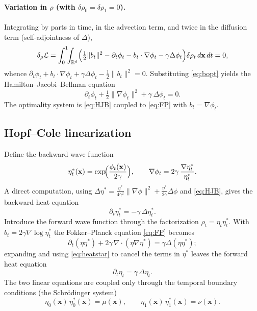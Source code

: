 \documentclass[11pt]{article}
\theoremstyle{remark}
\newcommand{\xv}{\mathbf{x}}
\newcommand{\grad}{\nabla}
\newcommand{\dive}{\grad\!\cdot\!}
\newcommand{\Rd}{\mathbb{R}^d}
\begin{document}
\paragraph{Variation in $\rho$ (with $\delta\rho_0=\delta\rho_1=0$).}
Integrating by parts in time, in the advection term, and twice in the diffusion term (self-adjointness of $\Delta$),
\begin{equation}
\delta_\rho\mathcal{L}=\int_0^1\!\!\int_{\Rd}\Bigl(\tfrac12\|b_t\|^2-\partial_t\phi_t-b_t\cdot\grad\phi_t-\gamma\Delta\phi_t\Bigr)\delta\rho_t\,d\xv\,dt=0,
\end{equation}
whence $\partial_t\phi_t+b_t\cdot\grad\phi_t+\gamma\Delta\phi_t-\tfrac12\|b_t\|^2=0$. Substituting \eqref{eq:bopt} yields the Hamilton--Jacobi--Bellman equation
\begin{equation}
\label{eq:HJB}
\partial_t\phi_t+\tfrac12\|\grad\phi_t\|^2+\gamma\,\Delta\phi_t=0 .
\end{equation}
The optimality system is \eqref{eq:HJB} coupled to \eqref{eq:FP} with $b_t=\grad\phi_t$.

\subsection{Hopf--Cole linearization}
Define the backward wave function
\begin{equation}
\label{eq:etastar}
\eta^\ast_t(\xv)=\exp\!\Bigl(\frac{\phi_t(\xv)}{2\gamma}\Bigr),
\qquad \grad\phi_t=2\gamma\,\frac{\grad\eta^\ast_t}{\eta^\ast_t}.
\end{equation}
A direct computation, using $\Delta\eta^\ast=\tfrac{\eta^\ast}{4\gamma^2}\|\grad\phi\|^2+\tfrac{\eta^\ast}{2\gamma}\Delta\phi$ and \eqref{eq:HJB}, gives the backward heat equation
\begin{equation}
\label{eq:heatstar}
\partial_t\eta^\ast_t=-\gamma\,\Delta\eta^\ast_t .
\end{equation}
Introduce the forward wave function through the factorization $\rho_t=\eta_t\eta^\ast_t$. With $b_t=2\gamma\grad\log\eta^\ast_t$ the Fokker--Planck equation \eqref{eq:FP} becomes
\begin{equation}
\partial_t(\eta\eta^\ast)+2\gamma\,\dive(\eta\grad\eta^\ast)=\gamma\Delta(\eta\eta^\ast);
\end{equation}
expanding and using \eqref{eq:heatstar} to cancel the terms in $\eta^\ast$ leaves the forward heat equation
\begin{equation}
\label{eq:heat}
\partial_t\eta_t=\gamma\,\Delta\eta_t .
\end{equation}
The two linear equations are coupled only through the temporal boundary
conditions (the Schr\"odinger system)
\begin{equation}
\label{eq:schrsys}
\eta_0(\xv)\,\eta^\ast_0(\xv)=\mu(\xv),\qquad
\eta_1(\xv)\,\eta^\ast_1(\xv)=\nu(\xv).
\end{equation}
\end{document}
